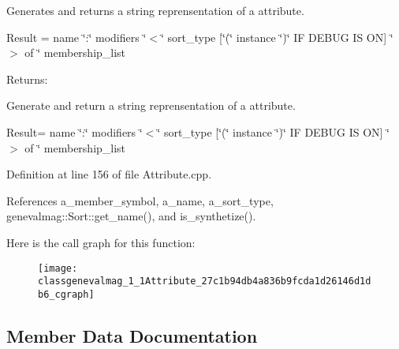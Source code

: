Generates and returns a string reprensentation of a attribute.\par
 \par
 Result = name \char`\"{}:\char`\"{} modifiers \char`\"{}$<$\char`\"{} sort\_\-type \mbox{[}\char`\"{}(\char`\"{} instance \char`\"{})\char`\"{} IF DEBUG IS ON\mbox{]} \char`\"{}$>$ of \char`\"{} membership\_\-list\par
 \par
 \begin{Desc}
\item[Returns:]\end{Desc}
Generate and return a string reprensentation of a attribute.

Result= name \char`\"{}:\char`\"{} modifiers \char`\"{}$<$\char`\"{} sort\_\-type \mbox{[}\char`\"{}(\char`\"{} instance \char`\"{})\char`\"{} IF DEBUG IS ON\mbox{]} \char`\"{}$>$ of \char`\"{} membership\_\-list 

Definition at line 156 of file Attribute.cpp.

References a\_\-member\_\-symbol, a\_\-name, a\_\-sort\_\-type, genevalmag::Sort::get\_\-name(), and is\_\-synthetize().

Here is the call graph for this function:\nopagebreak
\begin{figure}[H]
\begin{center}
\leavevmode
\texttt{[image: classgenevalmag\_1\_1Attribute\_27c1b94db4a836b9fcda1d26146d1db6\_cgraph]}
\end{center}
\end{figure}


\subsection{Member Data Documentation}
\hypertarget{classgenevalmag_1_1Attribute_c7e7d8421dcb4aa5678dee2133ec0a9b}{
\subsubsection[{a\_\-member\_\-symbol}]{}}
\label{classgenevalmag_1_1Attribute_c7e7d8421dcb4aa5678dee2133ec0a9b}


